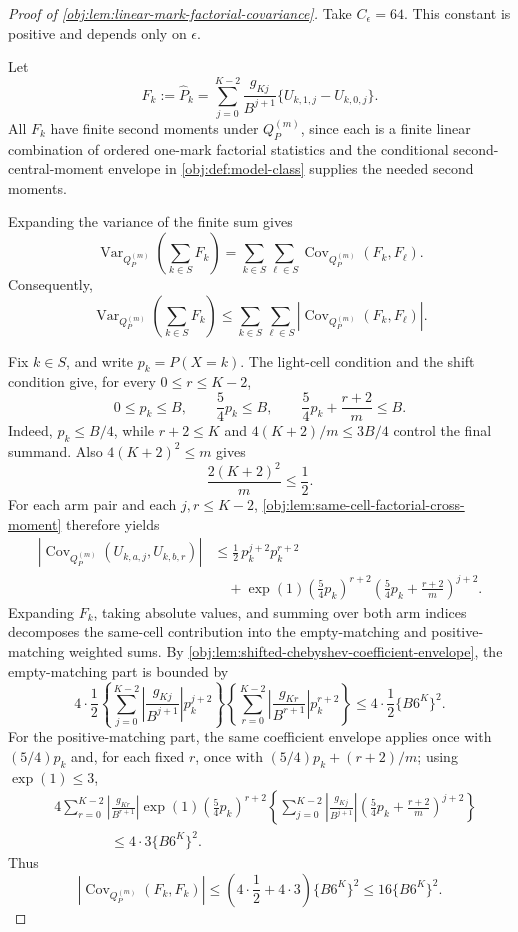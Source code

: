 \documentclass[11pt]{article}
\begin{document}
\begin{proof}[Proof of \cref{obj:lem:linear-mark-factorial-covariance}]
Take \(C_\epsilon=64\).  This constant is positive and depends only on \(\epsilon\).

Let
\[
F_k
:=
\widehat P_k
=
\sum_{j=0}^{K-2}\frac{g_{Kj}}{B^{j+1}}
\{U_{k,1,j}-U_{k,0,j}\}.
\]
All \(F_k\) have finite second moments under \(Q_P^{(m)}\), since each is a finite linear combination of ordered one-mark factorial statistics and the conditional second-central-moment envelope in \cref{obj:def:model-class} supplies the needed second moments.

Expanding the variance of the finite sum gives
\[
\operatorname{Var}_{Q_P^{(m)}}\!\left(\sum_{k\in S}F_k\right)
=
\sum_{k\in S}\sum_{\ell\in S}
\operatorname{Cov}_{Q_P^{(m)}}(F_k,F_\ell).
\]
Consequently,
\[
\operatorname{Var}_{Q_P^{(m)}}\!\left(\sum_{k\in S}F_k\right)
\le
\sum_{k\in S}\sum_{\ell\in S}
\left|\operatorname{Cov}_{Q_P^{(m)}}(F_k,F_\ell)\right|.
\]

Fix \(k\in S\), and write \(p_k=P(X=k)\).  The light-cell condition and the shift condition give, for every \(0\le r\le K-2\),
\[
0\le p_k\le B,
\qquad
\frac54p_k\le B,
\qquad
\frac54p_k+\frac{r+2}{m}\le B.
\]
Indeed, \(p_k\le B/4\), while \(r+2\le K\) and \(4(K+2)/m\le3B/4\) control the final summand.  Also \(4(K+2)^2\le m\) gives
\[
\frac{2(K+2)^2}{m}\le \frac12.
\]
For each arm pair and each \(j,r\le K-2\), \cref{obj:lem:same-cell-factorial-cross-moment} therefore yields
\[
\begin{aligned}
\left|\operatorname{Cov}_{Q_P^{(m)}}(U_{k,a,j},U_{k,b,r})\right|
&\le
\frac12\,p_k^{j+2}p_k^{r+2} \\
&\quad+
\exp(1)\left(\frac54p_k\right)^{r+2}
\left(\frac54p_k+\frac{r+2}{m}\right)^{j+2}.
\end{aligned}
\]
Expanding \(F_k\), taking absolute values, and summing over both arm indices decomposes the same-cell contribution into the empty-matching and positive-matching weighted sums.  By \cref{obj:lem:shifted-chebyshev-coefficient-envelope}, the empty-matching part is bounded by
\[
4\cdot\frac12
\left\{
\sum_{j=0}^{K-2}
\left|\frac{g_{Kj}}{B^{j+1}}\right|p_k^{j+2}
\right\}
\left\{
\sum_{r=0}^{K-2}
\left|\frac{g_{Kr}}{B^{r+1}}\right|p_k^{r+2}
\right\}
\le
4\cdot\frac12\{B6^K\}^2.
\]
For the positive-matching part, the same coefficient envelope applies once with \((5/4)p_k\) and, for each fixed \(r\), once with \((5/4)p_k+(r+2)/m\); using \(\exp(1)\le3\),
\[
\begin{aligned}
&4\sum_{r=0}^{K-2}
\left|\frac{g_{Kr}}{B^{r+1}}\right|
\exp(1)\left(\frac54p_k\right)^{r+2}
\left\{
\sum_{j=0}^{K-2}
\left|\frac{g_{Kj}}{B^{j+1}}\right|
\left(\frac54p_k+\frac{r+2}{m}\right)^{j+2}
\right\} \\
&\hspace{4em}\le
4\cdot3\{B6^K\}^2.
\end{aligned}
\]
Thus
\[
\left|\operatorname{Cov}_{Q_P^{(m)}}(F_k,F_k)\right|
\le
\left(4\cdot\frac12+4\cdot3\right)\{B6^K\}^2
\le
16\{B6^K\}^2 .
\]


\end{proof}
\end{document}
